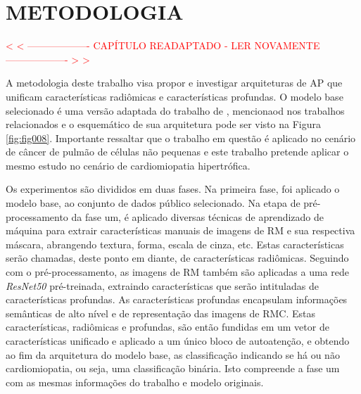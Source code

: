 \chapter{METODOLOGIA} 
\label{chap:metodologia}

\noindent \textcolor{red}{
< < ------------------- CAPÍTULO READAPTADO - LER NOVAMENTE ------------------- > >
}

A metodologia deste trabalho visa propor e investigar arquiteturas de \gls{AP} que unificam características radiômicas e características profundas. O modelo base selecionado é uma versão adaptada do trabalho de \cite{aiSelfAttentionBasedFusion2023}, mencionaod nos trabalhos relacionados e o esquemático de sua arquitetura pode ser visto na Figura \ref{fig:fig008}. Importante ressaltar que o trabalho em questão é aplicado no cenário de câncer de pulmão de células não pequenas e este trabalho pretende aplicar o mesmo estudo no cenário de cardiomiopatia hipertrófica.

 Os experimentos são divididos em duas fases. Na primeira fase, foi aplicado o modelo base, ao conjunto de dados público selecionado. Na etapa de pré-processamento da fase um, é aplicado diversas técnicas de aprendizado de máquina para extrair características manuais de imagens de RM e sua respectiva máscara, abrangendo textura, forma, escala de cinza, etc. Estas características serão chamadas, deste ponto em diante, de características radiômicas. Seguindo com o pré-processamento, as imagens de RM também são aplicadas a uma rede \textit{ResNet50} pré-treinada, extraindo características que serão intituladas de características profundas. As características profundas encapsulam informações semânticas de alto nível e de representação das imagens de \gls{RMC}. Estas características, radiômicas e profundas, são então fundidas em um vetor de características unificado e aplicado a um único bloco de autoatenção, e obtendo ao fim da arquitetura do modelo base, as classificação indicando se há ou não cardiomiopatia, ou seja, uma classificação binária. Isto compreende a fase um com as mesmas informações do trabalho e modelo originais.

